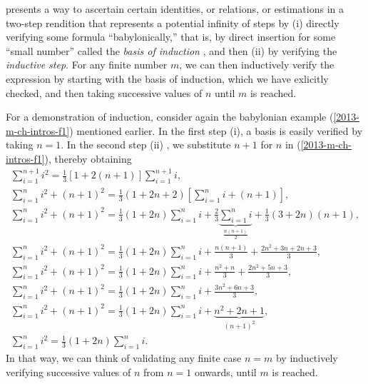  presents a way to ascertain certain identities, or relations, or estimations
in a two-step rendition that represents a potential infinity of
steps by (i)  directly verifying some formula ``babylonically,''
that is,  by direct insertion for some ``small number'' called the {\em basis of induction}
, and then (ii) by verifying the {\em inductive step}.
For any finite number $m$, we can then inductively verify the expression by starting with the basis of induction, which we have exlicitly checked,
and then taking successive values of $n$ until $m$ is reached.

{\color{OliveGreen}
\bproof
For a demonstration of induction, consider again the babylonian example (\ref{2013-m-ch-intros-f1}) mentioned earlier.
In the first step (i), a basis is easily verified by taking $n=1$.
In the second step (ii) , we substitute $n+1$ for $n$ in (\ref{2013-m-ch-intros-f1}),
thereby obtaining
\begin{equation}
\begin{split}
\sum_{i=1}^{n+1} i^2 = \frac{1}{3}\left[1+2(n+1)\right]\sum_{i=1}^{n+1} i              ,
\\
\sum_{i=1}^{n} i^2 + (n+1)^2 = \frac{1}{3}\left(1+2 n+2\right)\left[\sum_{i=1}^{n} i   +(n+1) \right],
\\
\sum_{i=1}^{n} i^2 + (n+1)^2 = \frac{1}{3}\left(1+2 n\right)\sum_{i=1}^{n} i  + \frac{2}{3}\underbrace{\sum_{i=1}^{n} i}_{\frac{n(n+1)}{2}} + \frac{1}{3}\left(3+2 n\right)(n+1) ,
\\
\sum_{i=1}^{n} i^2 + (n+1)^2 = \frac{1}{3}\left(1+2 n\right)\sum_{i=1}^{n} i  + \frac{n(n+1)}{3}+ \frac{2n^2 +3n + 2n +3}{3} ,
\\
\sum_{i=1}^{n} i^2 + (n+1)^2 = \frac{1}{3}\left(1+2 n\right)\sum_{i=1}^{n} i  + \frac{n^2+n}{3}+ \frac{2n^2 +5n +3}{3} ,
\\
\sum_{i=1}^{n} i^2 + (n+1)^2 = \frac{1}{3}\left(1+2 n\right)\sum_{i=1}^{n} i  +  \frac{3n^2 +6n +3}{3} ,
\\
\sum_{i=1}^{n} i^2 + (n+1)^2 = \frac{1}{3}\left(1+2 n\right)\sum_{i=1}^{n} i  +   \underbrace{n^2 +2n +1}_{(n+1)^2} ,
\\
\sum_{i=1}^{n} i^2  = \frac{1}{3}\left(1+2 n\right)\sum_{i=1}^{n} i
.
\end{split}
\label{2013-m-ch-intros-f2}
\end{equation}
In that way, we can think of validating any finite case $n=m$ by inductively verifying successive values of $n$ from $n=1$ onwards,  until $m$ is reached.

\eproof
}


